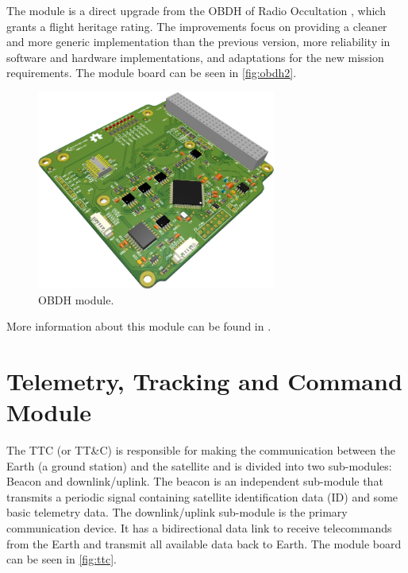 The module is a direct upgrade from the OBDH of Radio Occultation \cite{floripasat}, which grants a flight heritage rating. The improvements focus on providing a cleaner and more generic implementation than the previous version, more reliability in software and hardware implementations, and adaptations for the new mission requirements. The module board can be seen in \autoref{fig:obdh2}.

\begin{figure}[!ht]
    \begin{center}
        \includegraphics[width=0.7\textwidth]{figures/obdh2-pcb-3d}
        \caption{OBDH module.}
        \label{fig:obdh2}
    \end{center}
\end{figure}

More information about this module can be found in \cite{obdh2}.

\section{Telemetry, Tracking and Command Module}

The TTC (or TT\&C) is responsible for making the communication between the Earth (a ground station) and the satellite and is divided into two sub-modules: Beacon and downlink/uplink. The beacon is an independent sub-module that transmits a periodic signal containing satellite identification data (ID) and some basic telemetry data. The downlink/uplink sub-module is the primary communication device. It has a bidirectional data link to receive telecommands from the Earth and transmit all available data back to Earth. The module board can be seen in \autoref{fig:ttc}.

